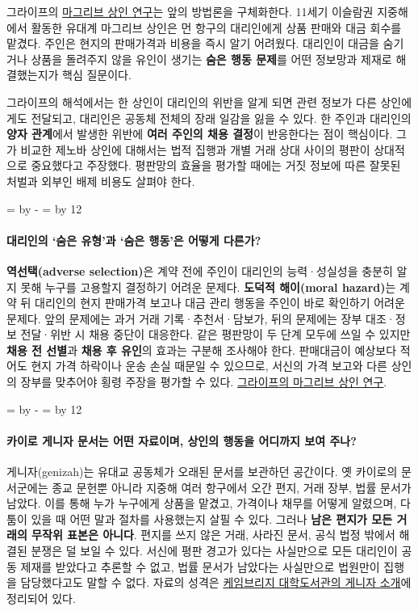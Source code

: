 \documentclass[10pt,a4paper]{article}
\newcommand{\ReserveQuestionSpace}{%
  \par\begingroup
  \dimen0=\pagegoal \advance\dimen0 by -\pagetotal
  \dimen2=\baselineskip \multiply\dimen2 by 12
  \ifdim\dimen0<\dimen2 \newpage\fi
  \endgroup}
\begin{document}
그라이프의 \href{https://web.stanford.edu/\%7Eavner/Greif\_Papers/1993\%20Greif\%20AER\%201993.pdf}{마그리브 상인 연구}는 앞의 방법론을 구체화한다. 11세기 이슬람권 지중해에서 활동한 유대계 마그리브 상인은 먼 항구의 대리인에게 상품 판매와 대금 회수를 맡겼다. 주인은 현지의 판매가격과 비용을 즉시 알기 어려웠다. 대리인이 대금을 숨기거나 상품을 돌려주지 않을 유인이 생기는 \textbf{숨은 행동 문제}를 어떤 정보망과 제재로 해결했는지가 핵심 질문이다.\par

그라이프의 해석에서는 한 상인이 대리인의 위반을 알게 되면 관련 정보가 다른 상인에게도 전달되고, 대리인은 공동체 전체의 장래 일감을 잃을 수 있다. 한 주인과 대리인의 \textbf{양자 관계}에서 발생한 위반에 \textbf{여러 주인의 채용 결정}이 반응한다는 점이 핵심이다. 그가 비교한 제노바 상인에 대해서는 법적 집행과 개별 거래 상대 사이의 평판이 상대적으로 중요했다고 주장했다. 평판망의 효율을 평가할 때에는 거짓 정보에 따른 잘못된 처벌과 외부인 배제 비용도 살펴야 한다.\par

\ReserveQuestionSpace
\paragraph{대리인의 ‘숨은 유형’과 ‘숨은 행동’은 어떻게 다른가?}
\textbf{역선택(adverse selection)}은 계약 전에 주인이 대리인의 능력·성실성을 충분히 알지 못해 누구를 고용할지 결정하기 어려운 문제다. \textbf{도덕적 해이(moral hazard)}는 계약 뒤 대리인의 현지 판매가격 보고나 대금 관리 행동을 주인이 바로 확인하기 어려운 문제다. 앞의 문제에는 과거 거래 기록·추천서·담보가, 뒤의 문제에는 장부 대조·정보 전달·위반 시 채용 중단이 대응한다. 같은 평판망이 두 단계 모두에 쓰일 수 있지만 \textbf{채용 전 선별}과 \textbf{채용 후 유인}의 효과는 구분해 조사해야 한다. 판매대금이 예상보다 적어도 현지 가격 하락이나 운송 손실 때문일 수 있으므로, 서신의 가격 보고와 다른 상인의 장부를 맞추어야 횡령 주장을 평가할 수 있다. \href{https://web.stanford.edu/\%7Eavner/Greif\_Papers/1993\%20Greif\%20AER\%201993.pdf}{그라이프의 마그리브 상인 연구}.\par

\ReserveQuestionSpace
\paragraph{카이로 게니자 문서는 어떤 자료이며, 상인의 행동을 어디까지 보여 주나?}
게니자(genizah)는 유대교 공동체가 오래된 문서를 보관하던 공간이다. 옛 카이로의 문서군에는 종교 문헌뿐 아니라 지중해 여러 항구에서 오간 편지, 거래 장부, 법률 문서가 남았다. 이를 통해 누가 누구에게 상품을 맡겼고, 가격이나 채무를 어떻게 알렸으며, 다툼이 있을 때 어떤 말과 절차를 사용했는지 살필 수 있다. 그러나 \textbf{남은 편지가 모든 거래의 무작위 표본은 아니다}. 편지를 쓰지 않은 거래, 사라진 문서, 공식 법정 밖에서 해결된 분쟁은 덜 보일 수 있다. 서신에 평판 경고가 있다는 사실만으로 모든 대리인이 공동 제재를 받았다고 추론할 수 없고, 법률 문서가 남았다는 사실만으로 법원만이 집행을 담당했다고도 말할 수 없다. 자료의 성격은 \href{https://www.lib.cam.ac.uk/collections/departments/taylor-schechter-genizah-research-unit}{케임브리지 대학도서관의 게니자 소개}에 정리되어 있다.\par
\end{document}
